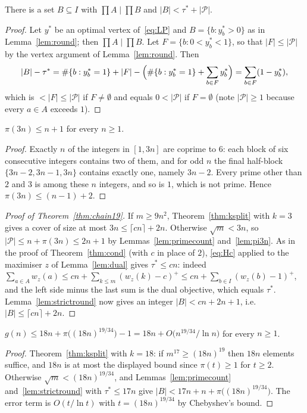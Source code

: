 \begin{lemma}\label{lem:strictround}
There is a set $B\subseteq I$ with $\prod A\mid\prod B$ and $|B|<\tau^*+|\mathcal P|$.
\end{lemma}
\begin{proof}
Let $y^*$ be an optimal vertex of~\eqref{eq:LP} and $B=\{b:y^*_b>0\}$ as in Lemma~\ref{lem:round}; then
$\prod A\mid\prod B$. Let $F=\{b:0<y^*_b<1\}$, so that $|F|\le|\mathcal P|$ by the vertex argument of
Lemma~\ref{lem:round}. Then
\[
|B|-\tau^*=\#\{b:y^*_b=1\}+|F|-\Bigl(\#\{b:y^*_b=1\}+\sum_{b\in F}y^*_b\Bigr)=\sum_{b\in F}(1-y^*_b),
\]
which is $<|F|\le|\mathcal P|$ if $F\ne\emptyset$ and equals $0<|\mathcal P|$ if $F=\emptyset$ (note
$|\mathcal P|\ge1$ because every $a\in A$ exceeds $1$).
\end{proof}

\begin{lemma}[primes up to $3n$]\label{lem:pi3n}
$\pi(3n)\le n+1$ for every $n\ge1$.
\end{lemma}
\begin{proof}
Exactly $n$ of the integers in $[1,3n]$ are coprime to $6$: each block of six consecutive integers contains two of them, and
for odd $n$ the final half-block $\{3n-2,3n-1,3n\}$ contains exactly one, namely $3n-2$. Every prime other than $2$
and $3$ is among these $n$ integers, and so is $1$, which is not prime. Hence $\pi(3n)\le(n-1)+2$.
\end{proof}

\begin{proof}[Proof of Theorem~\ref{thm:chain19}]
If $m\ge9n^2$, Theorem~\ref{thm:ksplit} with $k=3$ gives a cover of size at most $3n\le\lceil cn\rceil+2n$.
Otherwise $\sqrt m<3n$, so $|\mathcal P|\le n+\pi(3n)\le2n+1$ by Lemmas~\ref{lem:primecount} and~\ref{lem:pi3n}.
As in the proof of Theorem~\ref{thm:cond} (with $c$ in place of $2$), \eqref{eq:Hc} applied to the maximiser $z$ of
Lemma~\ref{lem:dual} gives $\tau^*\le cn$: indeed $\sum_{a\in A}w_z(a)\le cn+\sum_{k\le m}(w_z(k)-c)^+\le
cn+\sum_{b\in I}(w_z(b)-1)^+$, and the left side minus the last sum is the dual objective, which equals $\tau^*$.
Lemma~\ref{lem:strictround} now gives an integer $|B|<cn+2n+1$, i.e.\ $|B|\le\lceil cn\rceil+2n$.
\end{proof}

\begin{theorem}\label{thm:18n}
$g(n)\le18n+\pi\bigl((18n)^{19/34}\bigr)-1=18n+O\bigl(n^{19/34}/\ln n\bigr)$ for every $n\ge1$.
\end{theorem}
\begin{proof}
Theorem~\ref{thm:ksplit} with $k=18$: if $m^{17}\ge(18n)^{19}$ then $18n$ elements suffice, and $18n$ is at most the
displayed bound since $\pi(t)\ge1$ for $t\ge2$. Otherwise $\sqrt m<(18n)^{19/34}$, and Lemmas~\ref{lem:primecount}
and~\ref{lem:strictround} with $\tau^*\le17n$ give $|B|<17n+n+\pi\bigl((18n)^{19/34}\bigr)$. The error term is
$O(t/\ln t)$ with $t=(18n)^{19/34}$ by Chebyshev's bound.
\end{proof}

